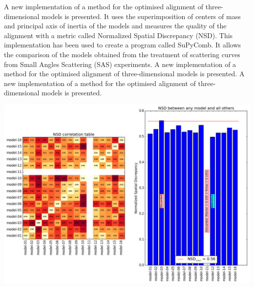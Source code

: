 \documentclass[11pt]{article}
\begin{document}
\begin{minipage}{0.55\linewidth}
    A new implementation of a method for the optimised alignment of 
    three-dimensional models is presented. 
    It uses the superimposition of centers of mass and principal axis of 
    inertia of the models and measures the quality of the alignment with a 
    metric called Normalized Spatial Discrepancy (NSD). 
    This implementation has been used to create a program called SuPyComb. 
    It allows the comparison of the models obtained from the treatment of 
    scattering curves from Small Angles Scattering (SAS) experiments.
    A new implementation of a method for the optimised alignment of 
    three-dimensional models is presented. 
    A new implementation of a method for the optimised alignment of 
    three-dimensional models is presented. 
\end{minipage} \hfill
\begin{minipage}{0.4\linewidth}
    \begin{flushleft}
    \includegraphics[scale=0.4]{nsd.png}
    \end{flushleft}
\end{minipage}


\begin{center}
\end{center}
\end{document}
